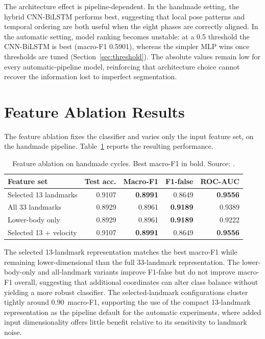 The architecture effect is pipeline-dependent. In the handmade setting, the
hybrid CNN-BiLSTM performs best, suggesting that local pose patterns and
temporal ordering are both useful when the eight phases are correctly aligned.
In the automatic setting, model ranking becomes unstable: at a 0.5 threshold the CNN-BiLSTM is best (macro-F1 0.5901), whereas the
simpler MLP wins once thresholds are tuned (Section~\ref{sec:threshold}). The
absolute values remain low for every automatic-pipeline model, reinforcing
that architecture choice cannot recover the information lost to imperfect
segmentation.

\section{Feature Ablation Results}
\label{sec:feature-ablation}

The feature ablation fixes the classifier and varies only the input feature
set, on the handmade pipeline. Table~\ref{tab:feature-ablation} reports the
resulting performance.

\begin{table}[htbp]
\centering
\caption[Feature ablation on handmade cycles. Source: \protect{}.]{Feature ablation on handmade cycles. Best macro-F1 in bold. Source: .}
\label{tab:feature-ablation}
\small
\begin{tabular}{lrrrr}
\toprule
Feature set & Test acc. & Macro-F1 & F1-false & ROC-AUC \\
\midrule
Selected 13 landmarks & 0.9107 & \textbf{0.8991} & 0.8649 & \textbf{0.9556} \\
All 33 landmarks & 0.8929 & 0.8961 & \textbf{0.9189} & 0.9389 \\
Lower-body only & 0.8929 & 0.8961 & \textbf{0.9189} & 0.9222 \\
Selected 13 + velocity & 0.9107 & \textbf{0.8991} & 0.8649 & \textbf{0.9556} \\
\bottomrule
\end{tabular}
\end{table}

The selected 13-landmark representation matches the best macro-F1 while
remaining lower-dimensional than the full 33-landmark representation. The
lower-body-only and all-landmark variants improve F1-false but do not improve
macro-F1 overall, suggesting that additional coordinates can alter class
balance without yielding a more robust classifier. The selected-landmark
configurations cluster tightly around 0.90~macro-F1, supporting the use of the
compact 13-landmark representation as the pipeline default for the automatic
experiments, where added input dimensionality offers little benefit relative
to its sensitivity to landmark noise.

